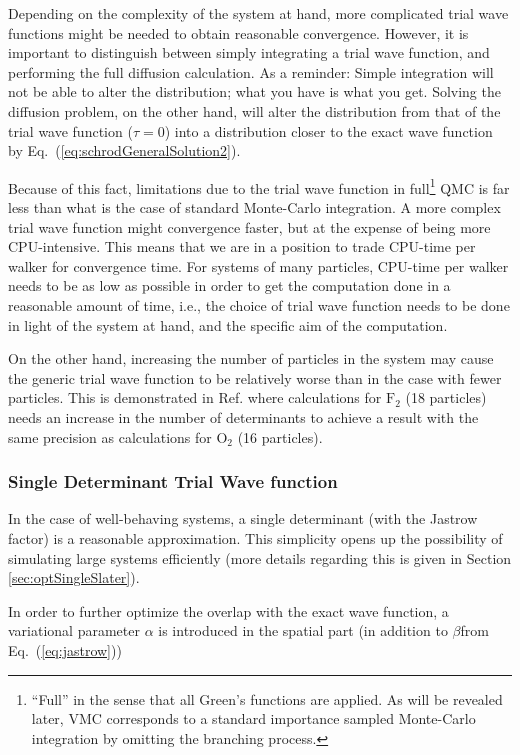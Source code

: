 Depending on the complexity of the system at hand, more complicated trial wave functions might be needed to obtain reasonable convergence. However, it is important to distinguish between simply integrating a trial wave function, and performing the full diffusion calculation. As a reminder: Simple integration will not be able to alter the distribution; what you have is what you get. Solving the diffusion problem, on the other hand, will alter the distribution from that of the trial wave function ($\tau = 0$) into a distribution closer to the exact wave function by Eq.~(\ref{eq:schrodGeneralSolution2}). 

Because of this fact, limitations due to the trial wave function in full\footnote{``Full'' in the sense that all Green's functions are applied. As will be revealed later, VMC corresponds to a standard importance sampled Monte-Carlo integration by omitting the branching process.} QMC is far less than what is the case of standard Monte-Carlo integration. A more complex trial wave function might convergence faster, but at the expense of being more CPU-intensive. This means that we are in a position to trade CPU-time per walker for convergence time. For systems of many particles, CPU-time per walker needs to be as low as possible in order to get the computation done in a reasonable amount of time, i.e., the choice of trial wave function needs to be done in light of the system at hand, and the specific aim of the computation. 

On the other hand, increasing the number of particles in the system may cause the generic trial wave function to be relatively worse than in the case with fewer particles. This is demonstrated in Ref. \cite{UmrigarMolecules} where calculations for $\mathrm{F}_2$ (18 particles) needs an increase in the number of determinants to achieve a result with the same precision as calculations for $\mathrm{O}_2$ (16 particles).  

\subsubsection{Single Determinant Trial Wave function}

In the case of well-behaving systems, a single determinant (with the Jastrow factor) is a reasonable approximation. This simplicity opens up the possibility of simulating large systems efficiently (more details regarding this is given in Section \ref{sec:optSingleSlater}). 

In order to further optimize the overlap with the exact wave function, a variational parameter $\alpha$ is introduced in the spatial part (in addition to $\beta$from Eq.~(\ref{eq:jastrow}))

